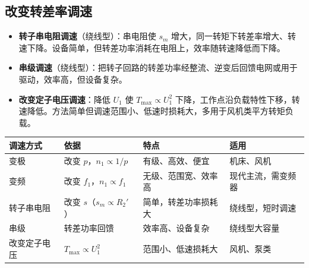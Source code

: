 \subsection{改变转差率调速}
\begin{itemize}
  \item \textbf{转子串电阻调速}（绕线型）：串电阻使 $s_m$ 增大，同一转矩下转差率增大、转速下降。设备简单，但转差功率消耗在电阻上，效率随转速降低而下降。
  \item \textbf{串级调速}（绕线型）：把转子回路的转差功率经整流、逆变后回馈电网或用于驱动，效率高，但设备复杂。
  \item \textbf{改变定子电压调速}：降低 $U_1$ 使 $T_{\max}\propto U_1^2$ 下降，工作点沿负载特性下移，转速降低。方法简单但调速范围小、低速时损耗大，多用于风机类平方转矩负载。
\end{itemize}

\begin{center}
\begin{tabular}{@{}p{2.3cm}p{3.4cm}p{3.8cm}p{3.4cm}@{}}
\toprule
调速方式 & 依据 & 特点 & 适用 \\
\midrule
变极 & 改变 $p$，$n_1\propto1/p$ & 有级、高效、便宜 & 机床、风机 \\
变频 & 改变 $f_1$，$n_1\propto f_1$ & 无级、范围宽、效率高 & 现代主流，需变频器 \\
转子串电阻 & 改变 $s$（$s_m\propto R_2'$） & 简单，转差功率损耗大 & 绕线型，短时调速 \\
串级 & 转差功率回馈 & 效率高、设备复杂 & 绕线型大容量 \\
改变定子电压 & $T_{\max}\propto U_1^2$ & 范围小、低速损耗大 & 风机、泵类 \\
\bottomrule
\end{tabular}
\end{center}

